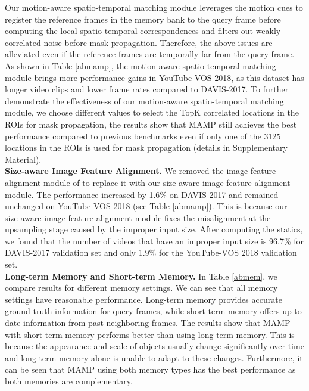 \documentclass[letterpaper]{article} \usepackage{aaai22}  \usepackage{times}  \usepackage{helvet}  \usepackage{courier}  \usepackage[hyphens]{url}  \usepackage{graphicx} \urlstyle{rm} \def\UrlFont{\rm}  \usepackage{natbib}  \usepackage{caption} \DeclareCaptionStyle{ruled}{labelfont=normalfont,labelsep=colon,strut=off} \frenchspacing  \setlength{\pdfpagewidth}{8.5in}  \setlength{\pdfpageheight}{11in}  \usepackage{algorithm}
\begin{document}
Our motion-aware spatio-temporal matching module leverages the motion cues to register the reference frames in the memory bank to the query frame before computing the local spatio-temporal correspondences and filters out weakly correlated noise before mask propagation. Therefore, the above issues are alleviated even if the reference frames are temporally far from the query frame. As shown in Table \ref{abmamp}, the motion-aware spatio-temporal matching module brings more performance gains in YouTube-VOS 2018, as this dataset has longer video clips and lower frame rates compared to DAVIS-2017. To further demonstrate the effectiveness of our motion-aware spatio-temporal matching module, we choose different  values to select the TopK correlated locations in the ROIs for mask propagation, the results show that MAMP still achieves the best performance compared to previous benchmarks even if only one of the 3125 locations in the ROIs is used for mask propagation (details in Supplementary Material).
\\





\noindent\textbf{Size-aware Image Feature Alignment.}
We removed the image feature alignment module of \cite{MAST} to replace it with our size-aware image feature alignment module. The performance increased by 1.6\% on DAVIS-2017 and remained unchanged on YouTube-VOS 2018 (see Table \ref{abmamp}). This is because our size-aware image feature alignment module fixes the misalignment at the upsampling stage caused by the improper input size. After computing the statics, we found that the number of videos that have an improper input size is 96.7\% for DAVIS-2017 validation set and only 1.9\% for the YouTube-VOS 2018 validation set.
\\

\noindent\textbf{Long-term Memory and Short-term Memory.} In Table \ref{abmem}, we compare results for different memory settings. We can see that all memory settings have reasonable performance. Long-term memory provides accurate ground truth information for query frames, while short-term memory offers up-to-date information from past neighboring frames. The results show that MAMP with short-term memory performs better than using long-term memory. This is because the appearance and scale of objects usually change significantly over time and long-term memory alone is unable to adapt to these changes. Furthermore, it can be seen that MAMP using both memory types has the best performance as both memories are complementary.
\end{document}
